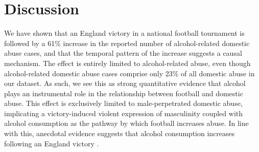 \documentclass[12pt, a4paper]{article}
\begin{document}



\clearpage

\section*{Discussion}

We have shown that an England victory in a national football tournament is followed by a 61\% increase in the reported number of alcohol-related domestic abuse cases, and that the temporal pattern of the increase suggests a causal mechanism. The effect is entirely limited to alcohol-related abuse, even though alcohol-related domestic abuse cases comprise only 23\% of all domestic abuse in our dataset. As such, we see this as strong quantitative evidence that alcohol plays an instrumental role in the relationship between football and domestic abuse. This effect is exclusively limited to male-perpetrated domestic abuse, implicating a victory-induced violent expression of masculinity coupled with alcohol consumption as the pathway by which football increases abuse. In line with this, anecdotal evidence suggests that alcohol consumption increases following an England victory \cite{Davies2018}. 
\end{document}
